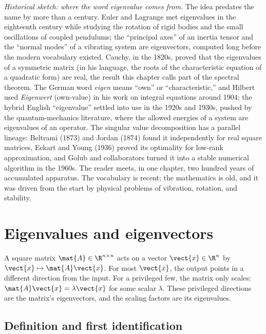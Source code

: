 \begin{mastery}
\textit{Historical sketch: where the word eigenvalue comes from.}
The idea predates the name by more than a century. Euler and Lagrange
met eigenvalues in the eighteenth century while studying the rotation
of rigid bodies and the small oscillations of coupled pendulums; the
``principal axes'' of an inertia tensor and the ``normal modes'' of a
vibrating system are eigenvectors, computed long before the modern
vocabulary existed. Cauchy, in the 1820s, proved that the eigenvalues
of a symmetric matrix (in his language, the roots of the
characteristic equation of a quadratic form) are real, the result
this chapter calls part of the spectral theorem. The German word
\emph{eigen} means ``own'' or ``characteristic,'' and Hilbert used
\emph{Eigenwert} (own-value) in his work on integral equations around
1904; the hybrid English ``eigenvalue'' settled into use in the 1920s
and 1930s, pushed by the quantum-mechanics literature, where the
allowed energies of a system are eigenvalues of an operator. The
singular value decomposition has a parallel lineage: Beltrami (1873)
and Jordan (1874) found it independently for real square matrices,
Eckart and Young (1936) proved its optimality for low-rank
approximation, and Golub and collaborators turned it into a stable
numerical algorithm in the 1960s. The reader meets, in one chapter,
two hundred years of accumulated apparatus. The vocabulary is recent;
the mathematics is old, and it was driven from the start by physical
problems of vibration, rotation, and stability.
\end{mastery}

\section{Eigenvalues and eigenvectors}

A square matrix $\mat{A} \in \R^{n \times n}$ acts on a vector
$\vect{x} \in \R^{n}$ by $\vect{x} \mapsto \mat{A}\vect{x}$. For most
$\vect{x}$, the output points in a different direction from the
input. For a privileged few, the matrix only scales: $\mat{A}
\vect{x} = \lambda \vect{x}$ for some scalar $\lambda$. These
privileged directions are the matrix's eigenvectors, and the scaling
factors are its eigenvalues.

\subsection{Definition and first identification}

